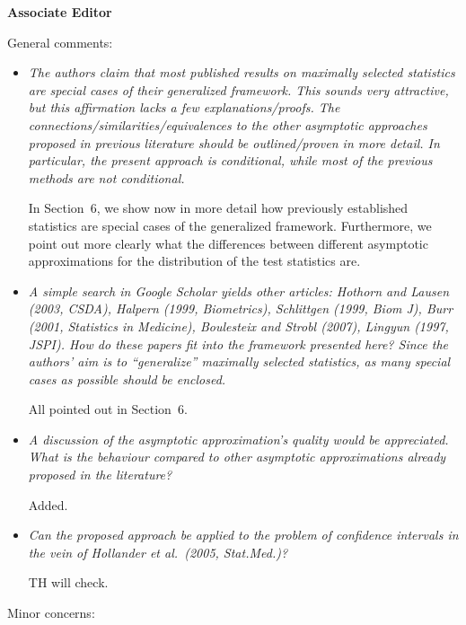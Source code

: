 \documentclass[11pt,a4paper]{article}
\begin{document}
\textbf{\large Associate Editor}

General comments:

\begin{itemize}

  \item \textit{The authors claim that most published results on maximally selected
        statistics are special cases of their generalized framework. This sounds very
	attractive, but this affirmation lacks a few explanations/proofs. The
        connections/similarities/equivalences to the other asymptotic approaches
        proposed in previous literature should be outlined/proven in more detail. In
        particular, the present approach is conditional, while most of the previous
        methods are not conditional.}
	
	In Section~6, we show now in more detail how previously established statistics
	are special cases of the generalized framework. Furthermore, we point out 
	more clearly what the differences between different asymptotic approximations
	for the distribution of the test statistics are.
	
  \item \textit{A simple search in Google Scholar yields other articles: Hothorn and
        Lausen (2003, CSDA), Halpern (1999, Biometrics), Schlittgen (1999, Biom J),
	Burr (2001, Statistics in Medicine), Boulesteix and Strobl (2007),
	Lingyun (1997, JSPI). How do these papers fit into the framework presented here?
	Since the authors' aim is to ``generalize'' maximally selected statistics, as
	many special cases as possible should be enclosed.}
	
	All pointed out in Section~6.
	
  \item \textit{A discussion of the asymptotic approximation's quality would be appreciated.
        What is the behaviour compared to other asymptotic approximations already
        proposed in the literature?}
	
	Added.
	
  \item \textit{Can the proposed approach be applied to the problem of confidence
        intervals in the vein of Hollander et al.\ (2005, Stat.Med.)?}
	
	TH will check.
	
\end{itemize}

Minor concerns:
\end{document}
